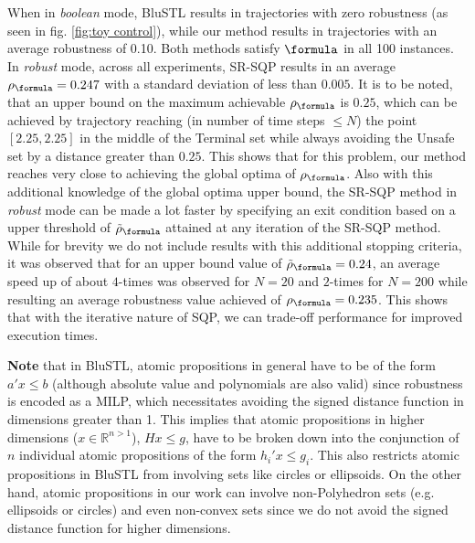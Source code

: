 When in \textit{boolean} mode, BluSTL results in trajectories with zero robustness (as seen in fig. \ref{fig:toy control}), while our method results in trajectories with an average robustness of 0.10. Both methods satisfy $\formula$ in all 100 instances. In \textit{robust} mode, across all experiments, SR-SQP results in an average $\rob_{\formula}=0.247$ with a standard deviation of less than $0.005$. It is to be noted, that an upper bound on the maximum achievable $\rob_{\formula}$ is $0.25$, which can be achieved by trajectory reaching (in number of time steps $\leq N$) the point $[2.25,2.25]$ in the middle of the Terminal set while always avoiding the Unsafe set by a distance greater than $0.25$. This shows that for this problem, our method reaches very close to achieving the global optima of $\rob_{\formula}$. Also with this additional knowledge of the global optima upper bound, the SR-SQP method in \textit{robust} mode can be made a lot faster by specifying an exit condition based on a upper threshold of $\srob_{\formula}$ attained at any iteration of the SR-SQP method. While for brevity we do not include results with this additional stopping criteria, it was observed that for an upper bound value of $\srob_{\formula}=0.24$, an average speed up of about $4$-times was observed for $N=20$ and $2$-times for $N=200$ while resulting an average robustness value achieved of $\rob_{\formula} = 0.235$. This shows that with the iterative nature of SQP, we can trade-off performance for improved execution times.

\textbf{Note} that in BluSTL, atomic propositions in general have to be of the form $a'x\leq b$ (although absolute value and polynomials are also valid) since robustness is encoded as a MILP, which necessitates avoiding the signed distance function in dimensions greater than 1. This implies that atomic propositions in higher dimensions ($x\in \mathbb{R}^{n>1}$), $Hx \leq g$, have to be broken down into the conjunction of $n$ individual atomic propositions of the form $h_i'x \leq g_i$. This also restricts atomic propositions in BluSTL from involving sets like circles or ellipsoids. On the other hand, atomic propositions in our work can involve non-Polyhedron sets (e.g. ellipsoids or circles) and even non-convex sets since we do not avoid the signed distance function for higher dimensions.

